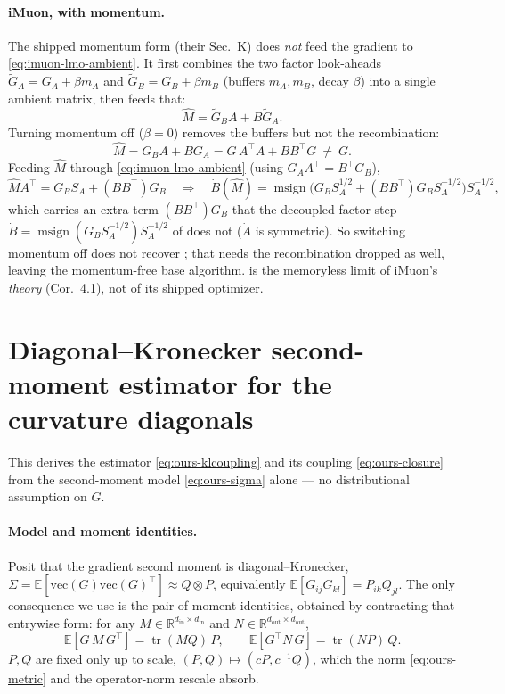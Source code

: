 \documentclass[11pt]{article}
\newcommand{\E}{\mathbb{E}}
\DeclareMathOperator{\polar}{msign}          %
\theoremstyle{plain}
\theoremstyle{definition}
\theoremstyle{remark}
\begin{document}
\paragraph{iMuon, with momentum.} The shipped momentum form (their Sec.~K) does \emph{not}
feed the gradient to \eqref{eq:imuon-lmo-ambient}. It first combines the two factor
look-aheads $\tilde G_A=G_A+\beta m_A$ and $\tilde G_B=G_B+\beta m_B$ (buffers $m_A,m_B$,
decay $\beta$) into a single ambient matrix, then feeds that:
\begin{equation*}
  \widehat M=\tilde G_B A+B\tilde G_A .
\end{equation*}
Turning momentum off ($\beta{=}0$) removes the buffers but not the recombination:
\begin{equation*}
  \widehat M=G_B A+B G_A=G\,A^\top A+BB^\top G\ \neq\ G .
\end{equation*}
Feeding $\widehat M$ through \eqref{eq:imuon-lmo-ambient} (using $G_A A^\top=B^\top G_B$),
\begin{equation*}
  \widehat M A^\top=G_B S_A+(BB^\top)G_B
  \quad\Longrightarrow\quad
  \dot B(\widehat M)=\polar\!\big(G_B S_A^{1/2}+(BB^\top)G_B S_A^{-1/2}\big)S_A^{-1/2},
\end{equation*}
which carries an extra term $(BB^\top)G_B$ that the decoupled factor step
$\dot B=\polar(G_B S_A^{-1/2})S_A^{-1/2}$ of  does not ($\dot A$ is symmetric).
So switching momentum off does not recover ; that needs the recombination
dropped as well, leaving the momentum-free base algorithm.  is the
memoryless limit of iMuon's \emph{theory} (Cor.~4.1), not of its shipped optimizer.

\section{Diagonal--Kronecker second-moment estimator for the curvature diagonals}
\label{app:matnormal}
This derives the estimator \eqref{eq:ours-klcoupling} and its coupling
\eqref{eq:ours-closure} from the second-moment model \eqref{eq:ours-sigma} alone --- no
distributional assumption on $G$.

\paragraph{Model and moment identities.} Posit that the gradient second moment is
diagonal--Kronecker, $\Sigma=\E[\mathrm{vec}(G)\mathrm{vec}(G)^\top]\approx Q\otimes P$,
equivalently $\E[G_{ij}G_{kl}]=P_{ik}Q_{jl}$. The only consequence we use is the pair of
moment identities, obtained by contracting that entrywise form: for any
$M\in\mathbb{R}^{d_{\mathrm{in}}\times d_{\mathrm{in}}}$ and
$N\in\mathbb{R}^{d_{\mathrm{out}}\times d_{\mathrm{out}}}$,
\begin{equation}
  \E[G\,M\,G^\top]=\operatorname{tr}(MQ)\,P,\qquad
  \E[G^\top N\,G]=\operatorname{tr}(NP)\,Q.
  \label{eq:moment-id}
\end{equation}
$P,Q$ are fixed only up to scale, $(P,Q)\mapsto(cP,c^{-1}Q)$, which the norm
\eqref{eq:ours-metric} and the operator-norm rescale absorb.
\end{document}
